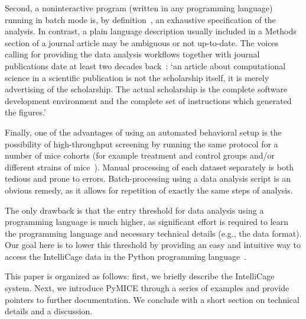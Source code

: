 Second, a noninteractive program (written in any programming language)
running in batch mode is, by 
definition~\cite{Hoare69anaxiomatic,Turing1936,Floyd1967Flowcharts,Mccarthy63abasis},
an exhaustive specification of the analysis. In contrast, a plain language
description usually included in a Methods section of a journal article
may be ambiguous or not up-to-date.
The voices calling for providing the data analysis workflows together with
journal publications date at least two decades back~\cite{buckheit1995}:
`an article about computational science in a scientific publication is not
the scholarship itself, it is merely advertising of the scholarship. The
actual scholarship is the complete software development environment and the
complete set of instructions which generated the figures.'

Finally, one of the advantages of using an automated behavioral setup 
is the possibility of high-throughput screening
by running the same protocol for a number of mice
cohorts (for example treatment and control groups and/or different strains
of mice~\cite{Puscian:2014cu}). Manual processing of each dataset separately
is both tedious and prone to errors. Batch-processing using a data
analysis script is an obvious remedy, as it allows for repetition of exactly
the same steps of analysis.

The only drawback is that the entry threshold for data analysis using a
programming language is much higher, as significant effort is required to
learn the programming language and necessary technical details (e.g., the data
format).
Our goal here is to lower this threshold by providing an easy and intuitive
way to access the IntelliCage data in the Python programming language~\cite{rossum1995}.

This paper is organized as follows: first, we briefly describe the IntelliCage system.
Next, we introduce PyMICE through a series of examples and provide pointers 
to further documentation. We conclude with a short section on technical details and 
a discussion.
